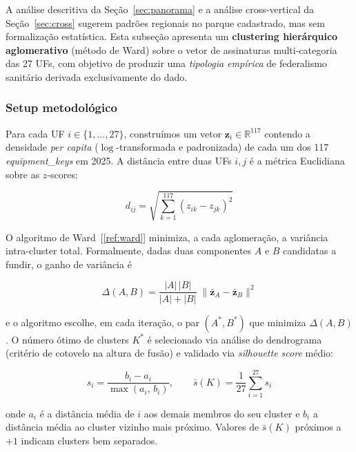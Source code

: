 \documentclass[12pt,a4paper,oneside]{article}
\begin{document}
A análise descritiva da Seção~\ref{sec:panorama} e a análise
cross-vertical da Seção~\ref{sec:cross} sugerem padrões regionais
no parque cadastrado, mas sem formalização estatística. Esta
subseção apresenta um \textbf{clustering hierárquico aglomerativo}
(método de Ward) sobre o vetor de assinaturas multi-categoria
das 27 UFs, com objetivo de produzir uma \textit{tipologia
empírica} de federalismo sanitário derivada exclusivamente do dado.

\subsubsection{Setup metodológico}

Para cada UF $i \in \{1, \ldots, 27\}$, construímos um vetor
$\mathbf{z}_i \in \mathbb{R}^{117}$ contendo a densidade
\textit{per capita} ($\log$-transformada e padronizada) de cada
um dos 117 \textit{equipment\_keys} em 2025. A distância entre
duas UFs $i, j$ é a métrica Euclidiana sobre as $z$-scores:

\begin{equation}
d_{ij} = \sqrt{\sum_{k=1}^{117} (z_{ik} - z_{jk})^2}
\label{eq:dist-ufs}
\end{equation}

\noindent
O algoritmo de Ward~[\ref{ref:ward}] minimiza, a cada
aglomeração, a variância intra-cluster total. Formalmente, dadas
duas componentes $A$ e $B$ candidatas a fundir, o ganho de
variância é

\begin{equation}
\Delta(A, B) =
\frac{|A|\,|B|}{|A| + |B|}\;
\bigl\|\bar{\mathbf{z}}_A - \bar{\mathbf{z}}_B\bigr\|^2
\label{eq:ward}
\end{equation}

\noindent
e o algoritmo escolhe, em cada iteração, o par
$(A^\ast, B^\ast)$ que minimiza $\Delta(A, B)$. O número ótimo
de clusters $K^\ast$ é selecionado via análise do dendrograma
(critério de cotovelo na altura de fusão) e validado via
\textit{silhouette score} médio:

\begin{equation}
s_i = \frac{b_i - a_i}{\max(a_i,\,b_i)}, \qquad
\bar{s}(K) = \frac{1}{27}\sum_{i=1}^{27} s_i
\label{eq:silhouette}
\end{equation}

\noindent
onde $a_i$ é a distância média de $i$ aos demais membros do
seu cluster e $b_i$ a distância média ao cluster vizinho mais
próximo. Valores de $\bar{s}(K)$ próximos a $+1$ indicam clusters
bem separados.
\end{document}
